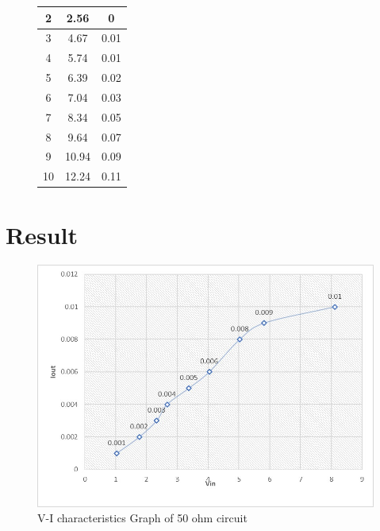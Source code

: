 \begin{figure}[htbp]
\begin{minipage}{0.3\textwidth}
\begin{tabular}{|c|c|c|}
            2                      & 2.56                                      & 0                                          \\ \hline
            3                      & 4.67                                      & 0.01                                       \\ \hline
            4                      & 5.74                                      & 0.01                                       \\ \hline
            5                      & 6.39                                      & 0.02                                       \\ \hline
            6                      & 7.04                                      & 0.03                                       \\ \hline
            7                      & 8.34                                      & 0.05                                       \\ \hline
            8                      & 9.64                                      & 0.07                                       \\ \hline
            9                      & 10.94                                     & 0.09                                       \\ \hline
            10                     & 12.24                                     & 0.11                                       \\ \hline
        \end{tabular}
        \label{tab:table3}
    \end{minipage}

    \label{fig:three_tables}
\end{figure}
\section{Result}
\begin{figure}[H]
    \centering
    \includegraphics[scale=0.3]{src/exp02/curve1.jpeg}
    \caption{V-I characteristics Graph of 50 ohm circuit}
\end{figure}

